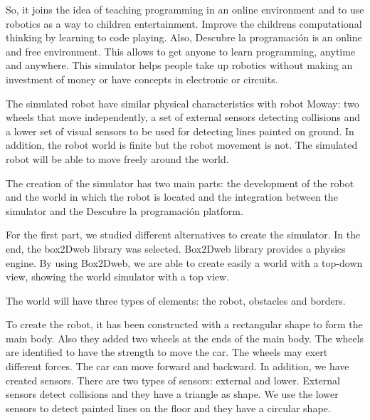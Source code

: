 So, it joins the idea of teaching programming in an online environment and to use robotics as a way to children entertainment. Improve the childrens computational thinking by learning to code playing. Also, Descubre la programación is an online and free environment. This allows to get anyone to learn programming, anytime and anywhere. This simulator helps people take up robotics without making an investment of money or have concepts in electronic or  circuits.




The simulated robot have similar physical characteristics with robot Moway: two wheels that move independently, a set of external sensors detecting collisions and a lower set of visual sensors to be used for detecting lines painted on ground. In addition, the robot world is finite but the robot movement is not. The simulated robot will be able to move freely around the world.


The creation of the simulator has two main parts: the development of the robot and the world in which the robot is located and the integration between the simulator and the Descubre la programación platform.

For the first part, we studied different alternatives to create the simulator. In the end, the box2Dweb library was selected. Box2Dweb library provides a physics engine. By using Box2Dweb, we are able to create easily a world with a top-down view, showing the world simulator with a top view.

The world will have three types of elements: the robot, obstacles and borders.


%
%

To create the robot, it has been constructed with a rectangular shape to form the main body. Also they added two wheels at the ends of the main body. The wheels are identified to have the strength to move the car. The wheels may exert different forces. The car can move forward and backward. In addition, we have created sensors. There are two types of sensors: external and lower. External sensors detect collisions and they have a triangle as shape. We use the lower sensors to detect painted lines on the floor and they have a circular shape.

